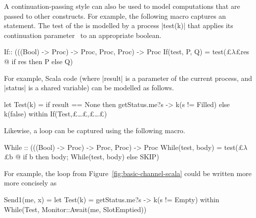 A continuation-passing style can also be used to model computations that are
passed to other constructs.  For example, the following macro captures an
 statement.  The test of the  is modelled by a process
|test(k)| that applies its continuation parameter~ to
an appropriate boolean.
%
\begin{cspm}
If:: (((Bool) -> Proc) -> Proc, Proc, Proc) -> Proc
If(test, P, Q) = test(£$\lambda$£res @ if res then P else Q)
\end{cspm}
%
For example, Scala code  (where |result| is a parameter of the current process, and
|status| is a shared variable) can be modelled as follows. 
%
\begin{cspm}
let Test(k) = if result == None then getStatus.me?s -> k(s != Filled) else k(false) within If(Test,£\ldots£,£\ldots£)
\end{cspm}
%
Likewise, a  loop can be captured using the following macro.
%
\begin{cspm}
While :: (((Bool) -> Proc) -> Proc, Proc) -> Proc
While(test, body) = test(£$\lambda$£b @ if b then body; While(test, body) else SKIP)
\end{cspm}
For example, the loop  from
Figure~\ref{fig:basic-channel-scala} could be written more more concisely as
\begin{cspm}
Send1(me, x) = 
  let Test(k) = getStatus.me?s -> k(s != Empty)
  within While(Test, Monitor::Await(me, SlotEmptied))
\end{cspm}
